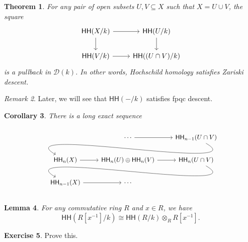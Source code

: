 \documentclass[10pt, oneside]{memoir}
\newtheorem{thm}{Theorem}[subsection]
\newtheorem{cor}[thm]{Corollary}
\newtheorem{lem}[thm]{Lemma}
\theoremstyle{definition}
\newtheorem{exer}[thm]{Exercise}
\theoremstyle{remark}
\newtheorem{rmk}[thm]{Remark}
\theoremstyle{plain}
\theoremstyle{definition}
\theoremstyle{remark}
\newcommand{\mc}[1]{\mathcal{#1}}
\newcommand{\ms}[1]{\mathsf{#1}}
\newcommand{\1}{\mathbf{1}}
\newcommand{\2}{\mathbf{2}}
\newcommand{\3}{\mathbf{3}}
\newcommand{\HH}{\ms{HH}}
\begin{document}
\begin{thm}\label{thm:zariskidescent}
    For any pair of open subsets $U, V \subseteq X$ such that $X = U \cup V$, the square
    \begin{equation*}
    \begin{tikzcd}
        \HH(X/k) \ar{r} \ar{d} & \HH(U/k) \ar{d} \\
        \HH(V/k) \ar{r} & \HH((U \cap V)/k)
    \end{tikzcd}
    \end{equation*}
    is a pullback in $\mc{D}(k)$. In other words, Hochschild homology satisfies Zariski descent.
\end{thm}

\begin{rmk}
    Later, we will see that $\HH(-/k)$ satisfies fpqc descent.
\end{rmk}

\begin{cor}
    There is a long exact sequence
    \begin{equation*}
        \begin{tikzcd}
            & \cdots \ar{r} & \HH_{n-1}(U \cap V) \arrow[out=-30, in=150]{dll} \\
            \HH_{n}(X) \ar{r} & \HH_n(U) \oplus \HH_n(V) \ar{r} & \HH_n(U \cap V) \arrow[out=-30,in=150]{dll} \\
            \HH_{n-1}(X) \ar{r} & \cdots
        \end{tikzcd}
    \end{equation*}
\end{cor}

\begin{lem}
    For any commutative ring $R$ and $x \in R$, we have
    \[ \HH(R[x^{-1}]/k) \cong \HH(R/k) \otimes_R R[x^{-1}]. \]
\end{lem}

\begin{exer}
    Prove this.
\end{exer}
\end{document}
